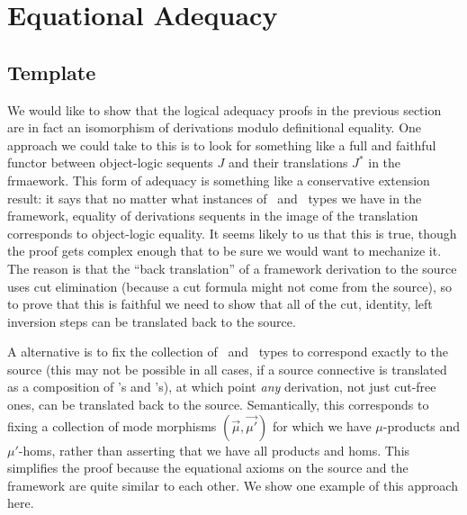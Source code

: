 \section{Equational Adequacy}
\label{sec:adequacy-equational}

\subsection{Template}

We would like to show that the logical adequacy proofs in the previous
section are in fact an isomorphism of derivations modulo definitional
equality.  One approach we could take to this is to look for something
like a full and faithful functor between object-logic sequents $J$ and
their translations $J^*$ in the frmaework.  This form of adequacy is
something like a conservative extension result: it says that no matter
what instances of \Fsymb\, and \Usymb\, types we have in the framework, equality
of derivations sequents in the image of the translation corresponds to
object-logic equality.  It seems likely to us that this is true, though
the proof gets complex enough that to be sure we would want to mechanize
it.  The reason is that the ``back translation'' of a framework
derivation to the source uses cut elimination (because a cut formula
might not come from the source), so to prove that this is faithful we
need to show that all of the cut, identity, left inversion steps can be
translated back to the source.  

A alternative is to fix the collection of \Fsymb\, and \Usymb\, types to
correspond exactly to the source (this may not be possible in all cases,
if a source connective is translated as a composition of \Fsymb's and
\Usymb's), at which point \emph{any} derivation, not just cut-free ones,
can be translated back to the source.  Semantically, this corresponds to
fixing a collection of mode morphisms $(\vec{\mu},\vec{\mu'})$ for which
we have $\mu$-products and $\mu'$-homs, rather than asserting that we
have all products and homs.  This simplifies the proof because the
equational axioms on the source and the framework are quite similar to
each other.  We show one example of this approach here.

\newcommand\backtrf[1]{\ensuremath{#1^{\leftarrow}}}
\newcommand\backtr[1]{\ensuremath{#1^{\Leftarrow}}}
\newcommand\str[2]{\ensuremath{\dsd{str}_{#1}(#2)}}

